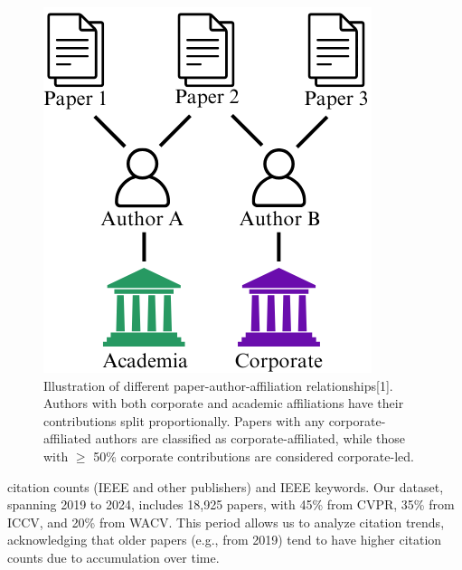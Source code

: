 \documentclass{article}
\begin{document}
\begin{figure}
\vspace{-100pt}
\centering
\includegraphics[width=.95\linewidth]{report/images/affiliation-combination.png}
\caption{Illustration of different paper-author-affiliation relationships[1]. Authors with both corporate and academic affiliations have their contributions split proportionally. Papers with any corporate-affiliated authors are classified as corporate-affiliated, while those with $\geq$ 50\% corporate contributions are considered corporate-led.}
\vspace{-15pt}
\label{fig:affiliation-combination}
\vspace{-20pt}
\end{figure}
citation counts (IEEE  and other publishers) and IEEE keywords. Our dataset, spanning 2019 to 2024, includes 18,925 papers, with 45\% from CVPR, 35\% from ICCV, and 20\% from WACV. This period allows us to analyze citation trends, acknowledging that older papers (e.g., from 2019) tend to have higher citation counts due to accumulation over time.
\end{document}

